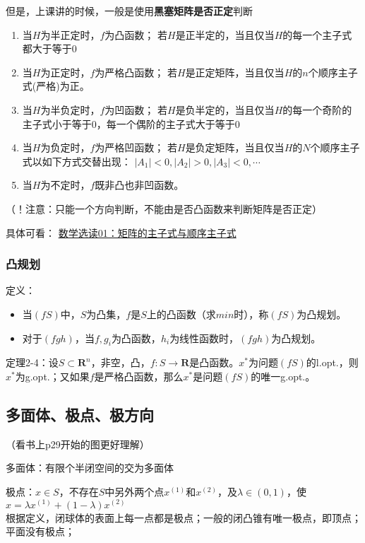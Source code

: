 \documentclass{book}
\begin{document}
但是，上课讲的时候，一般是使用\textbf{黑塞矩阵是否正定}判断
\begin{enumerate}
    \item 当$H$为半正定时，$f$为凸函数；
    若$H$是正半定的，当且仅当$H$的每一个主子式都大于等于0
    \item 当$H$为正定时，$f$为严格凸函数；
    若$H$是正定矩阵，当且仅当$H$的$n$个顺序主子式(严格)为正。
    \item 当$H$为半负定时，$f$为凹函数；
    若$H$是负半定的，当且仅当$H$的每一个奇阶的主子式小于等于0，每一个偶阶的主子式大于等于0
    \item 当$H$为负定时，$f$为严格凹函数；
    若$H$是负定矩阵，当且仅当$H$的$N$个顺序主子式以如下方式交替出现：
    $|A_1|<0, |A_2|>0, |A_3|<0, \cdots$
    \item 当$H$为不定时，$f$既非凸也非凹函数。
\end{enumerate}
（！注意：只能一个方向判断，不能由是否凸函数来判断矩阵是否正定）

具体可看：
\href{https://zhuanlan.zhihu.com/p/594455595}{数学选读01：矩阵的主子式与顺序主子式}

\subsubsection{凸规划}

定义：
    \begin{itemize}
    \item 当$(fS)$中，$S$为凸集，$f$是$S$上的凸函数（求$min$时），称$(fS)$为凸规划。
    \item 对于$(fgh)$，当$f, g_i$为凸函数，$h_i$为线性函数时，$(fgh)$为凸规划。
    \end{itemize}

定理2-4：设$S\subset \boldsymbol{R}^n$，非空，凸，$f:S\rightarrow\boldsymbol{R}$是凸函数。$x^*$为问题$(fS)$的l.opt.，则$x^*$为g.opt.；又如果$f$是严格凸函数，那么$x^*$是问题$(fS)$的唯一g.opt.。

\subsection{多面体、极点、极方向}
（看书上p29开始的图更好理解）

多面体：有限个半闭空间的交为多面体

极点：$x\in S$，不存在$S$中另外两个点$x^{(1)}$和$x^{(2)}$，及$\lambda\in(0,1)$，使$x=\lambda x^{(1)}+(1-\lambda)x^{(2)}$\\
根据定义，闭球体的表面上每一点都是极点；一般的闭凸锥有唯一极点，即顶点；平面没有极点；
\end{document}
